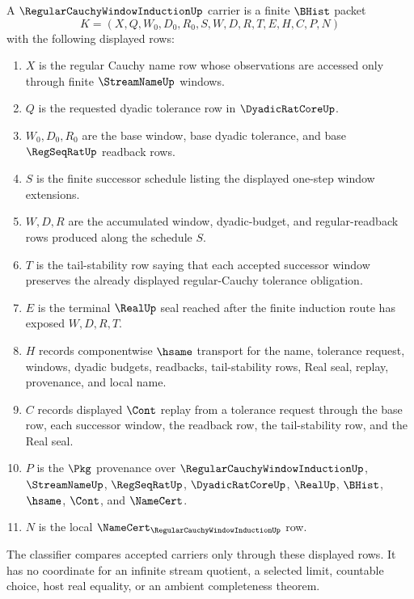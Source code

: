 \begin{definition}
\label{def:regular-cauchy-window-induction-carrier}
A $\RegularCauchyWindowInductionUp$ carrier is a finite $\BHist$ packet
$$
K=(X,Q,W_0,D_0,R_0,S,W,D,R,T,E,H,C,P,N)
$$
with the following displayed rows:
\begin{enumerate}
\item $X$ is the regular Cauchy name row whose observations are accessed only through finite $\StreamNameUp$ windows.
\item $Q$ is the requested dyadic tolerance row in $\DyadicRatCoreUp$.
\item $W_0,D_0,R_0$ are the base window, base dyadic tolerance, and base $\RegSeqRatUp$ readback rows.
\item $S$ is the finite successor schedule listing the displayed one-step window extensions.
\item $W,D,R$ are the accumulated window, dyadic-budget, and regular-readback rows produced along the schedule $S$.
\item $T$ is the tail-stability row saying that each accepted successor window preserves the already displayed regular-Cauchy tolerance obligation.
\item $E$ is the terminal $\RealUp$ seal reached after the finite induction route has exposed $W,D,R,T$.
\item $H$ records componentwise $\hsame$ transport for the name, tolerance request, windows, dyadic budgets, readbacks, tail-stability rows, Real seal, replay, provenance, and local name.
\item $C$ records displayed $\Cont$ replay from a tolerance request through the base row, each successor window, the readback row, the tail-stability row, and the Real seal.
\item $P$ is the $\Pkg$ provenance over $\RegularCauchyWindowInductionUp$, $\StreamNameUp$, $\RegSeqRatUp$, $\DyadicRatCoreUp$, $\RealUp$, $\BHist$, $\hsame$, $\Cont$, and $\NameCert$.
\item $N$ is the local $\NameCert_{\RegularCauchyWindowInductionUp}$ row.
\end{enumerate}
The classifier compares accepted carriers only through these displayed rows. It has no coordinate for an infinite stream quotient, a selected limit, countable choice, host real equality, or an ambient completeness theorem.
\end{definition}

